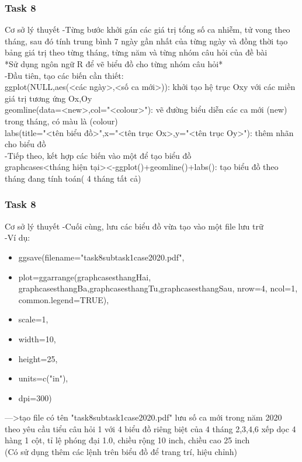 \documentclass[english,10pt,table]{beamer}
\begin{document}
\frame
{
    \frametitle{Task 8}
    \begin{block}{Cơ sở lý thuyết}
    -Từng bước khởi gán các giá trị tổng số ca nhiễm, tử vong theo tháng, sau đó tính trung bình 7 ngày gần nhất của từng ngày và đồng thời tạo bảng giá trị theo từng tháng, từng năm và từng nhóm câu hỏi của đề bài\\

        *Sử dụng ngôn ngữ R để vẽ biểu đồ cho từng nhóm câu hỏi*\\

        -Đầu tiên, tạo các biến cần thiết:\\
        ggplot(NULL,aes(<các ngày>,<số ca mới>)): khởi tạo hệ trục Oxy với các miền giá trị tương ứng Ox,Oy\\
        geomline(data=<new>,col="<colour>"): vẽ đường biểu diễn các ca mới (new) trong tháng, có màu là (colour)\\
        labs(title="<tên biểu đồ>",x="<tên trục Ox>,y="<tên trục Oy>"): thêm nhãn cho biểu đồ\\
        
        -Tiếp theo, kết hợp các biến vào một để tạo biểu đồ\\
        graphcases<tháng hiện tại><-ggplot()+geomline()+labs(): tạo biểu đồ theo tháng đang tính toán( 4 tháng tất cả)\\
    \end{block}
}
\frame
{
    \frametitle{Task 8}
    \begin{block}{Cơ sở lý thuyết}
    -Cuối cùng, lưu các biểu đồ vừa tạo vào một file lưu trữ\\
        -Ví dụ:\\
        \begin{itemize}
            \item ggsave(filename="task8subtask1case2020.pdf",\\
            \item plot=ggarrange(graphcasesthangHai, graphcasesthangBa,graphcasesthangTu,graphcasesthangSau, nrow=4, ncol=1, common.legend=TRUE),\\
            \item scale=1,\\
            \item width=10,\\
            \item height=25,\\
            \item units=c("in"),\\
            \item dpi=300)\\
        \end{itemize}
        --->tạo file có tên "task8subtask1case2020.pdf" lưu số ca mới trong năm 2020 theo yêu cầu tiểu câu hỏi 1 với 4 biểu đồ riêng biệt của 4 tháng 2,3,4,6 xếp dọc 4 hàng 1 cột, tỉ lệ phóng đại 1.0, chiều rộng 10 inch, chiều cao 25 inch\\
        
        (Có sử dụng thêm các lệnh trên biểu đồ để trang trí, hiệu chỉnh)
    \end{block}
}
\end{document}
